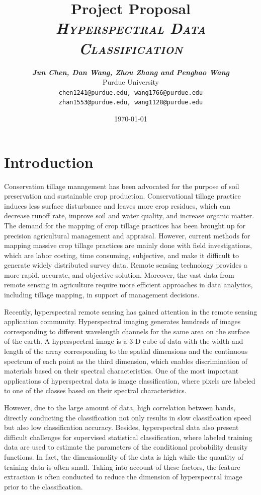 \documentclass[11pt]{article}
\title{
\textbf{Project Proposal} \\ \textsc{\textit{Hyperspectral Data Classification}} \\
}
\author{
	\textbf{\textit{Jun Chen, Dan Wang, Zhou Zhang and  Penghao Wang}} \\
	Purdue University\\
	\texttt{chen1241@purdue.edu, wang1766@purdue.edu}\\
	\texttt{zhan1553@purdue.edu, wang1128@purdue.edu}
}
\date{\today}
\begin{document}
\maketitle


\section{Introduction}

Conservation tillage management has been advocated for the purpose of soil preservation and sustainable crop production. Conservational tillage practice induces less surface disturbance and leaves more crop residues, which can decrease runoff rate, improve soil and water quality, and increase organic matter. The demand for the mapping of crop tillage practices has been brought up for precision agricultural management and appraisal. However, current methods for mapping massive crop tillage practices are mainly done with field investigations, which are labor costing, time consuming, subjective, and make it difficult to generate widely distributed survey data. Remote sensing technology provides a more rapid, accurate, and objective solution. Moreover, the vast data from remote sensing in agriculture require more efficient approaches in data analytics, including tillage mapping, in support of management decisions.
 
Recently, hyperspectral remote sensing has gained attention in the remote sensing application community. Hyperspectral imaging generates hundreds of images corresponding to different wavelength channels for the same area on the surface of the earth. A hyperspectral image is a 3-D cube of data with the width and length of the array corresponding to the spatial dimensions and the continuous spectrum of each point as the third dimension, which enables discrimination of materials based on their spectral characteristics. One of the most important applications of hyperspectral data is image classification, where pixels are labeled to one of the classes based on their spectral characteristics. 

However, due to the large amount of data, high correlation between bands, directly conducting the classification not only results in slow classification speed but also low classification accuracy. Besides, hyperspectral data also present difficult challenges for supervised statistical classification, where labeled training data are used to estimate the parameters of the conditional probability density functions. In fact, the dimensionality of the data is high while the quantity of training data is often small. Taking into account of these factors, the feature extraction is often conducted to reduce the dimension of hyperspectral image prior to the classification. 
\end{document}
